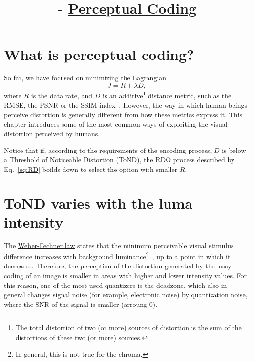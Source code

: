 

\title{\SM{} - \href{https://github.com/Sistemas-Multimedia/Sistemas-Multimedia.github.io/tree/master/contents/perceptual_coding}{Perceptual Coding}}

\maketitle
\tableofcontents

\section{What is perceptual coding?}

So far, we have focused on minimizing the
Lagrangian~\cite{sullivan1998rate}
\begin{equation}
  J = R + \lambda D,
  \label{eq:RD}
\end{equation}
where $R$ is the data rate, and $D$ is an additive\footnote{The total
distortion of two (or more) sources of distortion is the sum of the
distortions of these two (or more) sources.} distance metric, such as
the RMSE, the PSNR or the SSIM index~\cite{wang2004image}. However, the
way in which human beings perceive distortion is generally different
from how these metrics express it. This chapter introduces some of the
most common ways of exploiting the visual distortion perceived by
humans.

Notice that if, according to the requirements of the encoding process, $D$ is below
a Threshold of Noticeable Distortion (ToND), the RDO process described
by Eq.~\eqref{eq:RD} boilds down to select the option with smaller $R$.

\section{ToND varies with the luma intensity}

The \href{https://en.wikipedia.org/wiki/Weber%E2%80%93Fechner_law}{Weber-Fechner law} states that the minimum perceivable visual
stimulus difference increases with background
luminance\footnote{In general, this is not true for the
chroma.}~\cite{naccari2014perceptually}, up to a point in which it
decreases. Therefore, the perception of the distortion generated by
the lossy coding of an image is smaller in areas with higher and
lower intensity values. For this reason, one of the most used
quantizers is the deadzone, which also in general changes signal noise
(for example, electronic noise) by quantization noise, where the SNR
of the signal is smaller (arroung 0).


